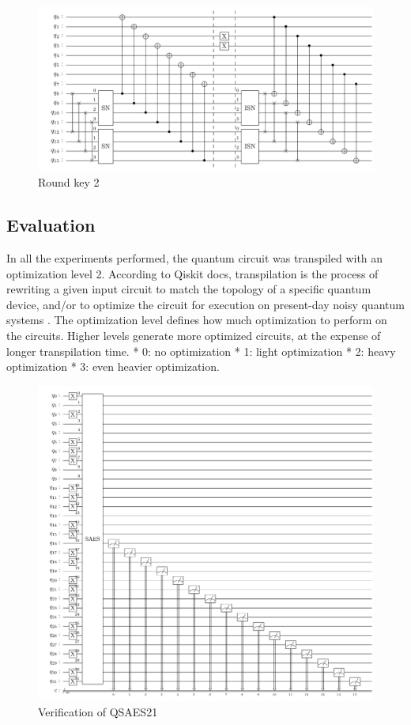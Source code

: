 \documentclass[preprint]{transcrypto}
\begin{document}
\begin{figure}[h!]
    \centering
    \includegraphics[width=0.8\linewidth]{saes21/r2k.pdf}
    \caption{Round key 2}
    \label{fig:rk221}
\end{figure}

\subsection{Evaluation}

In all the experiments performed, the quantum circuit was transpiled with an optimization level 2. According to Qiskit docs, transpilation is the process of rewriting a given input circuit to match the topology of a specific quantum device, and/or to optimize the circuit for execution on present-day noisy quantum systems \cite{transpile}. The optimization level defines how much optimization to perform on the circuits. Higher levels generate more optimized circuits, at the expense of longer transpilation time. * 0: no optimization * 1: light optimization * 2: heavy optimization * 3: even heavier optimization.  \cite{transpile}

\begin{figure}[h!]
    \centering
    \includegraphics[width=0.8\linewidth]{saes21/expt1.pdf}
    \caption{Verification of QSAES21}
    \label{fig:expt1}
\end{figure}
\end{document}
